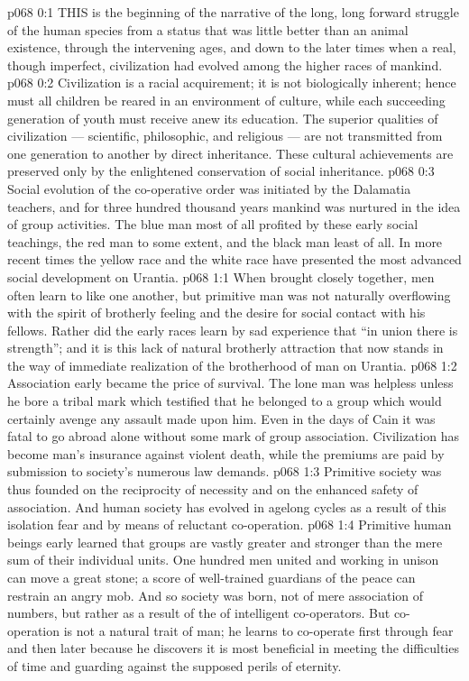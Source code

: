 \vs p068 0:1 THIS is the beginning of the narrative of the long, long forward struggle of the human species from a status that was little better than an animal existence, through the intervening ages, and down to the later times when a real, though imperfect, civilization had evolved among the higher races of mankind.
\vs p068 0:2 Civilization is a racial acquirement; it is not biologically inherent; hence must all children be reared in an environment of culture, while each succeeding generation of youth must receive anew its education. The superior qualities of civilization --- scientific, philosophic, and religious --- are not transmitted from one generation to another by direct inheritance. These cultural achievements are preserved only by the enlightened conservation of social inheritance.
\vs p068 0:3 Social evolution of the co\hyp{}operative order was initiated by the Dalamatia teachers, and for three hundred thousand years mankind was nurtured in the idea of group activities. The blue man most of all profited by these early social teachings, the red man to some extent, and the black man least of all. In more recent times the yellow race and the white race have presented the most advanced social development on Urantia.
\vs p068 1:1 When brought closely together, men often learn to like one another, but primitive man was not naturally overflowing with the spirit of brotherly feeling and the desire for social contact with his fellows. Rather did the early races learn by sad experience that “in union there is strength”; and it is this lack of natural brotherly attraction that now stands in the way of immediate realization of the brotherhood of man on Urantia.
\vs p068 1:2 Association early became the price of survival. The lone man was helpless unless he bore a tribal mark which testified that he belonged to a group which would certainly avenge any assault made upon him. Even in the days of Cain it was fatal to go abroad alone without some mark of group association. Civilization has become man’s insurance against violent death, while the premiums are paid by submission to society’s numerous law demands.
\vs p068 1:3 Primitive society was thus founded on the reciprocity of necessity and on the enhanced safety of association. And human society has evolved in agelong cycles as a result of this isolation fear and by means of reluctant co\hyp{}operation.
\vs p068 1:4 \pc Primitive human beings early learned that groups are vastly greater and stronger than the mere sum of their individual units. One hundred men united and working in unison can move a great stone; a score of well\hyp{}trained guardians of the peace can restrain an angry mob. And so society was born, not of mere association of numbers, but rather as a result of the  of intelligent co\hyp{}operators. But co\hyp{}operation is not a natural trait of man; he learns to co\hyp{}operate first through fear and then later because he discovers it is most beneficial in meeting the difficulties of time and guarding against the supposed perils of eternity.
